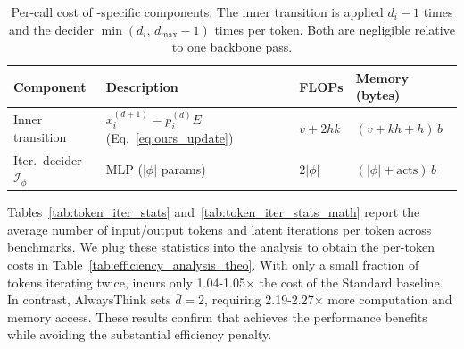 \begin{table}[ht]
\centering
\caption{Per-call cost of \name-specific components. The inner transition is applied $d_i{-}1$ times and the decider $\min(d_i,\,d_\text{max}{-}1)$ times per token. Both are negligible relative to one backbone pass.}
\label{tab:tah-extra}
\footnotesize
\setlength{\tabcolsep}{4pt}
\begin{tabular}{@{}llll@{}}
\toprule
\textbf{Component} & \textbf{Description} & \textbf{FLOPs} & \textbf{Memory (bytes)} \\
\midrule
Inner transition
  & $x_i^{(d+1)}{=}p_i^{(d)}E$ (Eq.~\ref{eq:ours_update})
  & $v + 2hk$
  & $(v {+} kh {+} h)\,b$ \\[3pt]
Iter.\ decider $\mathcal{I}_\phi$
  & MLP ($|\phi|$ params)
  & $2|\phi|$
  & $(|\phi| {+} \text{acts})\,b$ \\
\bottomrule
\end{tabular}
\end{table}

Tables~\ref{tab:token_iter_stats} and~\ref{tab:token_iter_stats_math} report the average number of input/output tokens and latent iterations per token across benchmarks.
We plug these statistics into the analysis to obtain the per-token costs in Table~\ref{tab:efficiency_analysis_theo}.
With only a small fraction of tokens iterating twice, \name incurs only 1.04-1.05$\times$ the cost of the Standard baseline.
In contrast, AlwaysThink sets $\bar{d}{=}2$, requiring 2.19-2.27$\times$ more computation and memory access.
These results confirm that \name achieves the performance benefits while avoiding the substantial efficiency penalty.


